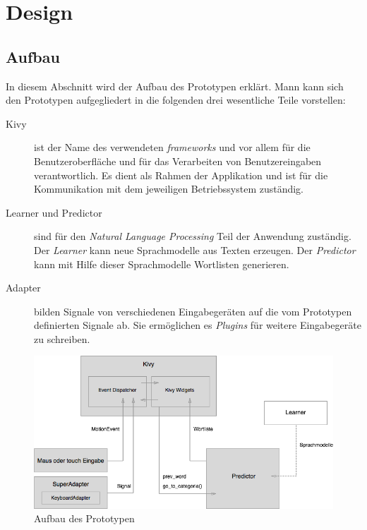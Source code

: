 \section{Design}
	
    \subsection{Aufbau}
    	In diesem Abschnitt wird der Aufbau des Prototypen erklärt. Mann kann sich den Prototypen aufgegliedert in die folgenden drei wesentliche Teile vorstellen:
            
		\begin{description}
			\item[Kivy] ist der Name des verwendeten \emph{frameworks} und vor allem für die Benutzeroberfläche und für das Verarbeiten von Benutzereingaben verantwortlich. Es dient als Rahmen der Applikation und ist für die Kommunikation mit dem jeweiligen Betriebssystem zuständig.
        
        	\item[Learner und Predictor] sind für den \emph{Natural Language Processing} Teil der Anwendung zuständig. Der \emph{Learner} kann neue Sprachmodelle aus Texten erzeugen. Der \emph{Predictor} kann mit Hilfe dieser Sprachmodelle Wortlisten generieren. 
        
        	\item[Adapter] bilden Signale von verschiedenen Eingabegeräten auf die vom Prototypen definierten Signale ab. Sie ermöglichen es \emph{Plugins} für weitere Eingabegeräte zu schreiben.
		\end{description}
        
        \begin{figure}[H]
			\centering
            \includegraphics[width=.8\linewidth]{images/aufbau.png}
            \caption{Aufbau des Prototypen}
            \label{fig:architecture}
        \end{figure}
    
